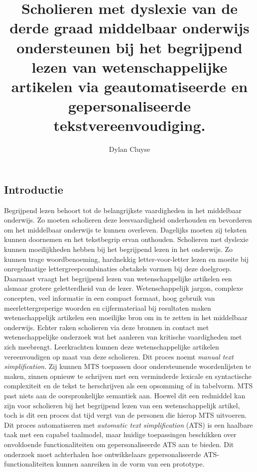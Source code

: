 \documentclass[a0,portrait]{hogent-poster}
\title{Scholieren met dyslexie van de derde graad middelbaar onderwijs ondersteunen bij het begrijpend lezen van wetenschappelijke artikelen via geautomatiseerde en gepersonaliseerde tekstvereenvoudiging.}
\subtitle{}
\author{Dylan Cluyse}
\begin{document}
\maketitle

\begin{abstract}

\end{abstract}

\begin{multicols}{2} %

\section{Introductie}

Begrijpend lezen behoort tot de belangrijkste vaardigheden in het middelbaar onderwijs. Zo moeten scholieren deze leesvaardigheid onderhouden en bevorderen om het middelbaar onderwijs te kunnen overleven. Dagelijks moeten zij teksten kunnen doornemen en het tekstbegrip ervan onthouden. Scholieren met dyslexie kunnen moeilijkheden hebben bij het begrijpend lezen in het onderwijs. Zo kunnen trage woordbenoeming, hardnekkig letter-voor-letter lezen en moeite bij onregelmatige lettergreepcombinaties obstakels vormen bij deze doelgroep. Daarnaast vraagt het begrijpend lezen van wetenschappelijke artikelen een alsmaar grotere geletterdheid van de lezer. Wetenschappelijk jargon, complexe concepten, veel informatie in een compact formaat, hoog gebruik van meerlettergreperige woorden en cijfermateriaal bij resultaten maken wetenschappelijk artikelen een moeilijke bron om in te zetten in het middelbaar onderwijs. Echter raken scholieren via deze bronnen in contact met wetenschappelijke onderzoek wat het aanleren van kritische vaardigheden met zich meebrengt. Leerkrachten kunnen deze wetenschappelijke artikelen vereenvoudigen op maat van deze scholieren. Dit proces noemt \textit{manual text simplification}. Zij kunnen MTS toepassen door ondersteunende woordenlijsten te maken, zinnen opnieuw te schrijven met een verminderde lexicale en syntactische complexiteit en de tekst te herschrijven als een opsomming of in tabelvorm. MTS past niets aan de oorspronkelijke semantiek aan. Hoewel dit een redmiddel kan zijn voor scholieren bij het begrijpend lezen van een wetenschappelijk artikel, toch is dit een proces dat tijd vergt van de personen die hierop MTS uitvoeren. Dit proces automatiseren met \textit{automatic text simplification} (ATS) is een haalbare taak met een capabel taalmodel, maar huidige toepassingen beschikken over onvoldoende functionaliteiten om gepersonaliseerde ATS aan te bieden. Dit onderzoek moet achterhalen hoe ontwikkelaars gepersonaliseerde ATS-functionaliteiten kunnen aanreiken in de vorm van een prototype.




\end{multicols}
\end{document}
